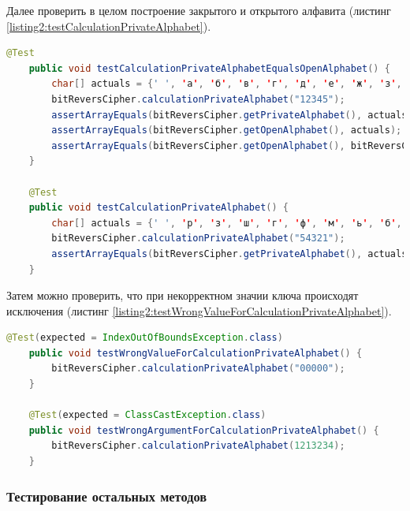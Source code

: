 \documentclass[a4paper,12pt]{article}
\begin{document}
Далее проверить в целом построение закрытого и открытого алфавита (листинг \ref{listing2:testCalculationPrivateAlphabet}).
\begin{lstlisting}[language=java, caption=метод calculationPrivateAlphabet, label=listing2:testCalculationPrivateAlphabet]
    @Test
    public void testCalculationPrivateAlphabetEqualsOpenAlphabet() {
        char[] actuals = {' ', 'а', 'б', 'в', 'г', 'д', 'е', 'ж', 'з', 'и', 'к', 'л', 'м', 'н', 'о', 'п', 'р', 'с', 'т', 'у', 'ф', 'х', 'ц', 'ч', 'ш', 'щ', 'ъ', 'ы', 'ь', 'э', 'ю', 'я'};
        bitReversCipher.calculationPrivateAlphabet("12345");
        assertArrayEquals(bitReversCipher.getPrivateAlphabet(), actuals);
        assertArrayEquals(bitReversCipher.getOpenAlphabet(), actuals);
        assertArrayEquals(bitReversCipher.getOpenAlphabet(), bitReversCipher.getOpenAlphabet());
    }

    @Test
    public void testCalculationPrivateAlphabet() {
        char[] actuals = {' ', 'р', 'з', 'ш', 'г', 'ф', 'м', 'ь', 'б', 'т', 'к', 'ъ', 'е', 'ц', 'о', 'ю', 'а', 'с', 'и', 'щ', 'д', 'х', 'н', 'э', 'в', 'у', 'л', 'ы', 'ж', 'ч', 'п', 'я'};
        bitReversCipher.calculationPrivateAlphabet("54321");
        assertArrayEquals(bitReversCipher.getPrivateAlphabet(), actuals);
    }
\end{lstlisting}
Затем можно проверить, что при некорректном значии ключа происходят исключения (листинг \ref{listing2:testWrongValueForCalculationPrivateAlphabet}).
\begin{lstlisting}[language=java, caption=метод calculationPrivateAlphabet, label=listing2:testWrongValueForCalculationPrivateAlphabet]
    @Test(expected = IndexOutOfBoundsException.class)
    public void testWrongValueForCalculationPrivateAlphabet() {
        bitReversCipher.calculationPrivateAlphabet("00000");
    }

    @Test(expected = ClassCastException.class)
    public void testWrongArgumentForCalculationPrivateAlphabet() {
        bitReversCipher.calculationPrivateAlphabet(1213234);
    }
\end{lstlisting}

\subsubsection{Тестирование остальных методов}
\end{document}
